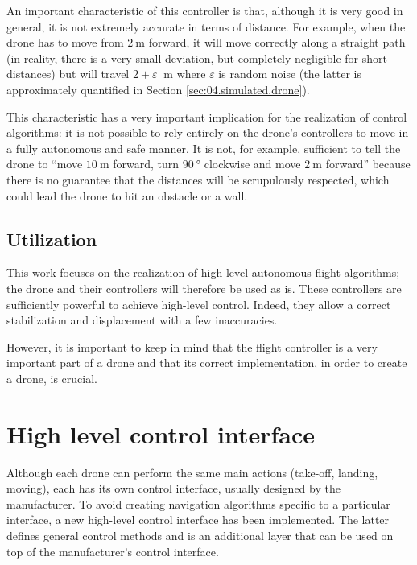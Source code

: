 An important characteristic of this controller is that, although it is very good in general, it is not extremely accurate in terms of distance. For example, when the drone has to move from $\SI{2}{\meter}$ forward, it will move correctly along a straight path (in reality, there is a very small deviation, but completely negligible for short distances) but will travel $\num{2} + \varepsilon$ $\SI{}{\meter}$ where $\varepsilon$ is random noise (the latter is approximately quantified in Section \ref{sec:04.simulated.drone}).

This characteristic has a very important implication for the realization of control algorithms: it is not possible to rely entirely on the drone's controllers to move in a fully autonomous and safe manner. It is not, for example, sufficient to tell the drone to \enquote{move $\SI{10}{\meter}$ forward, turn $\SI{90}{\degree}$ clockwise and move $\SI{2}{\meter}$ forward} because there is no guarantee that the distances will be scrupulously respected, which could lead the drone to hit an obstacle or a wall.

\subsection{Utilization}

This work focuses on the realization of high-level autonomous flight algorithms; the drone and their controllers will therefore be used as is. These controllers are sufficiently powerful to achieve high-level control. Indeed, they allow a correct stabilization and displacement with a few inaccuracies.

However, it is important to keep in mind that the flight controller is a very important part of a drone and that its correct implementation, in order to create a drone, is crucial.

\section{High level control interface}

Although each drone can perform the same main actions (take-off, landing, moving), each has its own control interface, usually designed by the manufacturer. To avoid creating navigation algorithms specific to a particular interface, a new high-level control interface has been implemented. The latter defines general control methods and is an additional layer that can be used on top of the manufacturer's control interface.

